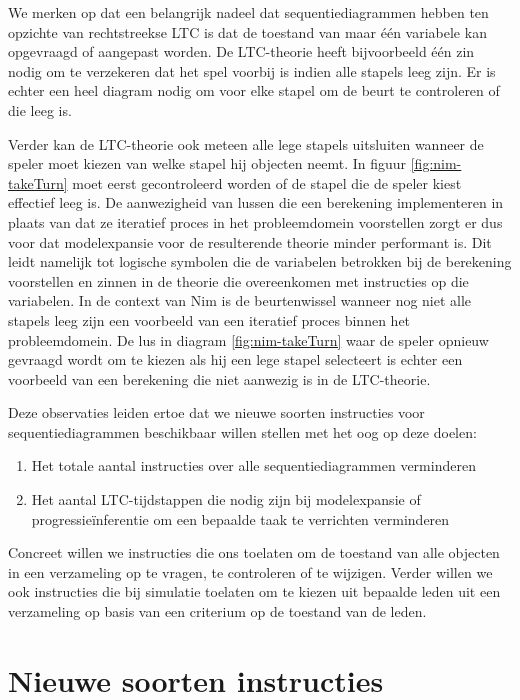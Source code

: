 We merken op dat een belangrijk nadeel dat sequentiediagrammen hebben ten opzichte van rechtstreekse LTC is dat de toestand van maar \'e\'en variabele kan opgevraagd of aangepast worden. De LTC-theorie heeft bijvoorbeeld \'e\'en zin nodig om te verzekeren dat het spel voorbij is indien alle stapels leeg zijn. Er is echter een heel diagram nodig om voor elke stapel om de beurt te controleren of die leeg is.

Verder kan de LTC-theorie ook meteen alle lege stapels uitsluiten wanneer de speler moet kiezen van welke stapel hij objecten neemt. In figuur \ref{fig:nim-takeTurn} moet eerst gecontroleerd worden of de stapel die de speler kiest effectief leeg is. De aanwezigheid van lussen die een berekening implementeren in plaats van dat ze iteratief proces in het probleemdomein voorstellen zorgt er dus voor dat modelexpansie voor de resulterende theorie minder performant is. Dit leidt namelijk tot logische symbolen die de variabelen betrokken bij de berekening voorstellen en zinnen in de theorie die overeenkomen met instructies op die variabelen. In de context van Nim is de beurtenwissel wanneer nog niet alle stapels leeg zijn een voorbeeld van een iteratief proces binnen het probleemdomein. De lus in diagram \ref{fig:nim-takeTurn} waar de speler opnieuw gevraagd wordt om te kiezen als hij een lege stapel selecteert is echter een voorbeeld van een berekening die niet aanwezig is in de LTC-theorie.

Deze observaties leiden ertoe dat we nieuwe soorten instructies voor sequentiediagrammen beschikbaar willen stellen met het oog op deze doelen:

\begin{enumerate}
	\item Het totale aantal instructies over alle sequentiediagrammen verminderen
	\item Het aantal LTC-tijdstappen die nodig zijn bij modelexpansie of progressie\"inferentie om een bepaalde taak te verrichten verminderen
\end{enumerate}

Concreet willen we instructies die ons toelaten om de toestand van alle objecten in een verzameling op te vragen, te controleren of te wijzigen. Verder willen we ook instructies die bij simulatie toelaten om te kiezen uit bepaalde leden uit een verzameling op basis van een criterium op de toestand van de leden.

\section{Nieuwe soorten instructies}

